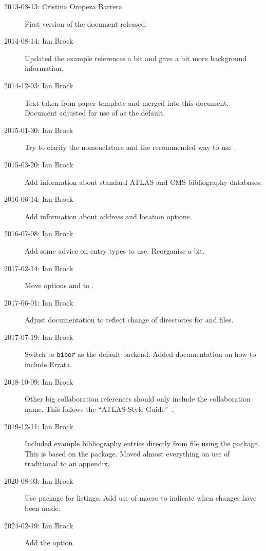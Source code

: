 \documentclass[REPORT=false, UKenglish]{atlasdoc}
\begin{document}
\begin{description}
\item[2013-08-13: Cristina Oropeza Barrera] First version of the document released.
\item[2014-08-14: Ian Brock] Updated the example references a bit and gave a bit more background information.
\item[2014-12-03: Ian Brock] Text taken from paper template and merged into this document.
  Document adjusted for use of  as the default.
\item[2015-01-30: Ian Brock] Try to clarify the nomenclature and
  the recommended way to use \BibTeX.
\item[2015-03-20: Ian Brock] Add information about standard ATLAS and CMS bibliography databases.
\item[2016-06-14: Ian Brock] Add information about address and location options.
\item[2016-07-08: Ian Brock] Add some advice on entry types to use. Reorganise a bit.
\item[2017-02-14: Ian Brock] Move options  and  to .
\item[2017-06-01: Ian Brock] Adjust documentation to reflect change of directories for  and  files.
\item[2017-07-19: Ian Brock] Switch to \texttt{biber} as the default  backend.
  Added documentation on how to include Errata.
\item[2018-10-09: Ian Brock] Other big collaboration references should only include the collaboration name.
  This follows the \enquote{ATLAS Style Guide}~\cite{atlas-style}.
\item[2019-12-11: Ian Brock] Included example bibliography entries directly from  file using the  package.
  This is based on the  package.
  Moved almost everything on use of traditional \BibTeX to an appendix.
\item[2020-08-03: Ian Brock] Use  package for listings.
  Add use of  macro to indicate when changes have been made.
\item[2024-02-19: Ian Brock] Add the  option.
\end{description}
\end{document}

